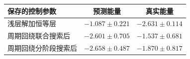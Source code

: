 \begin{tabular}{lcc}
\toprule
保存的控制参数 & 预测能量 & 真实能量 \\
\midrule
浅层解加恒等层 & $-1.087\pm0.221$ & $-2.631\pm0.114$ \\
周期回绕联合搜索后 & $-2.601\pm0.705$ & $-1.537\pm0.681$ \\
周期回绕分阶段搜索后 & $-2.658\pm0.487$ & $-1.870\pm0.817$ \\
\bottomrule
\end{tabular}
